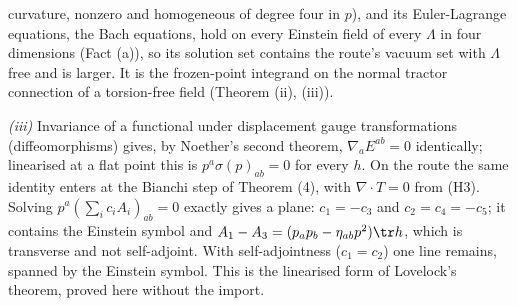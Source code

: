 curvature, nonzero and homogeneous of degree four in $p$), and its Euler-Lagrange equations, the Bach equations, hold on every Einstein field of every $\Lambda$ in four dimensions (Fact (a)), so its solution set contains the route's vacuum set with $\Lambda$ free and is larger. It is the frozen-point integrand on the normal tractor connection of a torsion-free field (Theorem (ii), (iii)).

\emph{(iii)} Invariance of a functional under displacement gauge transformations (diffeomorphisms) gives, by Noether's second theorem, $\nabla_{a}E^{ab} = 0$ identically; linearised at a flat point this is $p^{a}\sigma(p)_{ab} = 0$ for every $h$. On the route the same identity enters at the Bianchi step of Theorem (4), with $\nabla\cdot T = 0$ from (H3). Solving $p^{a}(\sum_{i} c_{i}A_{i})_{ab} = 0$ exactly gives a plane: $c_{1} = -c_{3}$ and $c_{2} = c_{4} = -c_{5}$; it contains the Einstein symbol and $A_{1} - A_{3} = (p_{a}p_{b} - \eta_{ab}p^{2})\tr h$, which is transverse and not self-adjoint. With self-adjointness ($c_{1} = c_{2}$) one line remains, spanned by the Einstein symbol. This is the linearised form of Lovelock's theorem, proved here without the import.

